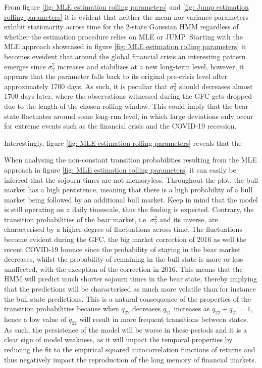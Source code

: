 From figure \ref{fig: MLE estimation rolling parameters} and \ref{fig: Jump estimation rolling parameters} it is evident that neither the mean nor variance parameters exhibit stationarity across time
for the 2-state Gaussian HMM regardless of whether the estimation procedure relies on MLE or JUMP. Starting with the MLE approach showcased in figure \ref{fig: MLE estimation rolling parameters} it becomes eveident that around the global financial crisis an interesting pattern emerges since $\sigma_2^2$ increases and stabilizes at a new long-term level, however, it appears that the parameter falls back to its original pre-crisis level after approximately 1700 days. As such, it is peculiar that $\sigma_2^2$ should decreases almost 1700 days later, where the observations witnessed during the GFC gets dropped due to the length of the chosen rolling window. This could imply that the bear state fluctuates around some long-run level, in which large deviations only occur for extreme events such as the financial crisis and the COVID-19 recession. 

Interestingly, figure \ref{fig: MLE estimation rolling parameters} reveals that the

When analysing the non-constant transition probabilities resulting from the MLE approach in figure \ref{fig: MLE estimation rolling parameters} it can easily be inferred that the sojourn times are not memoryless. Throughout the plot, the bull market has a high persistence, meaning that there is a high probability of a bull market being followed by an additional bull market. Keep in mind that the model is still operating on a daily timescale, thus the finding is expected. Contrary, the transition probabilities of the bear market, i.e. $\sigma_2^2$ and its inverse, are characterised by a higher degree of fluctuations across time. The fluctuations become evident during the GFC, the big market correction of 2016 as well the recent COVID-19 bounce since the probability of staying in the bear market decreases, whilst the probability of remaining in the bull state is more or less unaffected, with the exception of the correction in 2016. This means that the HMM will predict much shorter sojourn times in the bear state, thereby implying that the predictions will be characterised as much more volatile than for instance the bull state predictions. This is a natural consequence of the properties of the transition probabilities because when $q_{22}$ decreases $q_{21}$ increases as $q_{22} + q_{21} = 1$, hence a low value of $q_{22}$ will result in more frequent transitions between states. As such, the persistence of the model will be worse in these periods and it is a clear sign of model weakness, as it will impact the temporal properties by reducing the fit to the empirical squared autocorrelation functions of returns and thus negatively impact the reproduction of the long memory of financial markets. 

